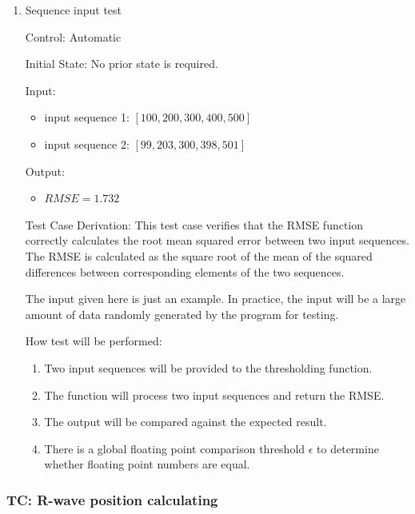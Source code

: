 \documentclass[12pt, titlepage]{article}
\begin{document}
\begin{enumerate}

  \item{Sequence input test\\}
  
  Control: Automatic
            
  Initial State: No prior state is required.
            
  Input:
  \begin{itemize}
    \item input sequence 1: $[100, 200, 300, 400, 500]$
    \item input sequence 2: $[99, 203, 300, 398, 501]$
  \end{itemize}
  
  Output:
  \begin{itemize}
    \item $RMSE = 1.732$
  \end{itemize}
  
  Test Case Derivation: This test case verifies that the RMSE function correctly
  calculates the root mean squared error between two input sequences.  The RMSE
  is calculated as the square root of the mean of the squared differences
  between corresponding elements of the two sequences.

  The input given here is just an example.  In practice, the input will be a
  large amount of data randomly generated by the program for testing.
            
  How test will be performed: 
  \begin{enumerate}
    \item Two input sequences will be provided to the thresholding function.
    \item The function will process two input sequences and return the RMSE.
    \item The output will be compared against the expected result.
    \item There is a global floating point comparison threshold $\epsilon$ to
    determine whether floating point numbers are equal.
  \end{enumerate}

\end{enumerate}

 \label{TC_ALG}
\subsubsection{TC\thetestcasenum : R-wave position calculating}
\end{document}
